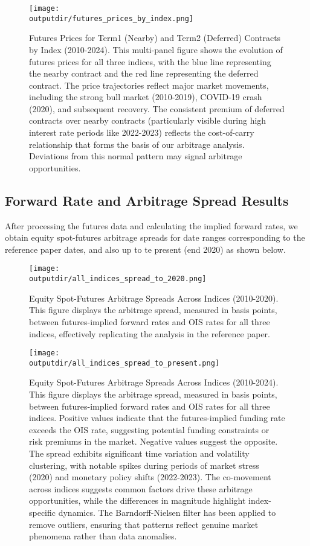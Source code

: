 \documentclass{article}
\newcommand{\outputdir}{../_output}
\begin{document}
\begin{figure}[H]
  \centering
  \texttt{[image: \\outputdir/futures\_prices\_by\_index.png]}
  \caption{Futures Prices for Term1 (Nearby) and Term2 (Deferred) Contracts by Index (2010-2024). This multi-panel figure shows the evolution of futures prices for all three indices, with the blue line representing the nearby contract and the red line representing the deferred contract. The price trajectories reflect major market movements, including the strong bull market (2010-2019), COVID-19 crash (2020), and subsequent recovery. The consistent premium of deferred contracts over nearby contracts (particularly visible during high interest rate periods like 2022-2023) reflects the cost-of-carry relationship that forms the basis of our arbitrage analysis. Deviations from this normal pattern may signal arbitrage opportunities.}
  \label{fig:futures_prices}
\end{figure}

\subsection{Forward Rate and Arbitrage Spread Results}

After processing the futures data and calculating the implied forward rates, we obtain equity spot-futures arbitrage spreads for date ranges corresponding to the reference paper dates, and also up to te present (end 2020) as shown below.


\begin{figure}[H]
  \centering
  \texttt{[image: \\outputdir/all\_indices\_spread\_to\_2020.png]}
  \caption{Equity Spot-Futures Arbitrage Spreads Across Indices (2010-2020). This figure displays the arbitrage spread, measured in basis points, between futures-implied forward rates and OIS rates for all three indices, effectively replicating the analysis in the reference paper.}
  \label{fig:arbitrage_spreads}
\end{figure}


\begin{figure}[H]
  \centering
  \texttt{[image: \\outputdir/all\_indices\_spread\_to\_present.png]}
  \caption{Equity Spot-Futures Arbitrage Spreads Across Indices (2010-2024). This figure displays the arbitrage spread, measured in basis points, between futures-implied forward rates and OIS rates for all three indices. Positive values indicate that the futures-implied funding rate exceeds the OIS rate, suggesting potential funding constraints or risk premiums in the market. Negative values suggest the opposite. The spread exhibits significant time variation and volatility clustering, with notable spikes during periods of market stress (2020) and monetary policy shifts (2022-2023). The co-movement across indices suggests common factors drive these arbitrage opportunities, while the differences in magnitude highlight index-specific dynamics. The Barndorff-Nielsen filter has been applied to remove outliers, ensuring that patterns reflect genuine market phenomena rather than data anomalies.}
  \label{fig:arbitrage_spreads}
\end{figure}
\end{document}
